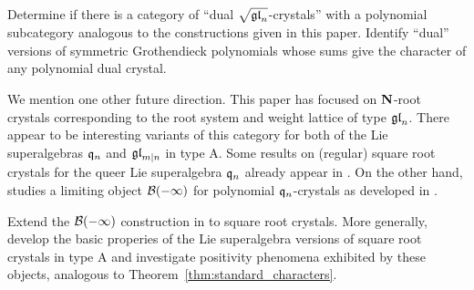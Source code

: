 \documentclass[11pt]{article}
\begin{document}
\begin{problem}
Determine if there is a category of ``dual $\sqrt{\mathfrak{gl}_n}$-crystals'' with 
a polynomial subcategory
analogous to the constructions given in this paper. Identify ``dual'' versions of symmetric Grothendieck polynomials whose sums give the character
of any polynomial dual crystal.
\end{problem}

We mention one other future direction. 
This paper has focused on  $\mathbf{N}$-root crystals corresponding to 
the root system and weight lattice of type $\mathfrak{gl}_n$. 
There appear to be interesting variants of this category for 
both of the Lie superalgebras $\mathfrak{q}_n$ and $\mathfrak{gl}_{m|n}$ in type A.
Some results on (regular) square root crystals for the queer Lie superalgebra $\mathfrak{q}_n$
 already appear in \cite{MT2023}.
On the other hand, \cite{SalScr} studies a limiting object $\mathcal{B}(-\infty)$
for polynomial $\mathfrak{q}_n$-crystals as developed in \cite{GJKKK10,GJKKK}.

\begin{problem}
Extend the $\mathcal{B}(-\infty)$ construction in \cite{SalScr}
to square root crystals. More generally, develop the basic properies of 
the Lie superalgebra versions of square root crystals in type A
and investigate positivity phenomena exhibited by these objects, analogous to Theorem~\ref{thm:standard_characters}. 
\end{problem}





\end{document}
